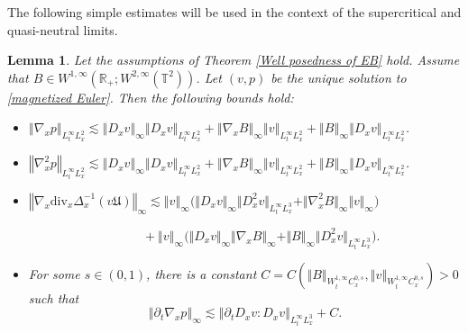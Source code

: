 \documentclass[11pt,reqno]{amsart}
\newtheorem{lem}[thm]{Lemma}
\numberwithin{equation}{section}
\begin{document}
The following simple estimates will be used in the context of the supercritical and quasi-neutral limits. 
\begin{lem}\label{basic estimates}
Let the assumptions of {\rm Theorem \ref{Well posedness of EB}} hold.  Assume 
that $B\in W^{1,\infty}(\mathbb{R}_{+};W^{2,\infty}(\mathbb{T}^{2}))$. 
Let $(v,p)$ be the unique solution to \eqref{magnetized Euler}. 
Then the following bounds hold{\rm:} 
\begin{itemize}
   \item[{\rm(i)}]
    $\left\Vert \nabla_{x}p\right\Vert_{L^{\infty}_{t}L^{2}_{x}}\lesssim
    \left\Vert D_{x}v\right\Vert_{\infty} \left\Vert D_{x}v\right\Vert_{L^{\infty}_{t}L^{2}_{x}}
    +\left\Vert \nabla_{x}B\right\Vert_{\infty}\left\Vert v\right\Vert_{L^\infty_tL^2_x}
    +\left\Vert B\right\Vert_{\infty}\left\Vert D_xv\right\Vert_{L^\infty_tL^2_x}$.
    \item[{\rm(ii)}] $\left\Vert \nabla_{x}^{2}p\right\Vert_{L^{\infty}_{t}L^2_{x}}\lesssim
    \left\Vert D_{x}v\right\Vert_{\infty}\left\Vert D_{x}v\right\Vert_{L^{\infty}_{t}L^{2}_{x}}
    +\left\Vert \nabla_{x}B\right\Vert_{\infty}\left\Vert v\right\Vert_{L^\infty_tL^2_x}
    +\left\Vert B\right\Vert_{\infty}\left\Vert D_xv\right\Vert_{L^\infty_tL^2_x}$.
   \item[{\rm(iii)}] 
$\left\Vert \nabla_{x}\mathrm{div}_{x}\Delta^{-1}_{x}(v\mathfrak{U})\right\Vert_{\infty}
   \lesssim\left\Vert v\right\Vert_{\infty}\big(\Vert D_{x}v\Vert_{\infty}\Vert D_{x}^{2}v\Vert_{L^{\infty}_{t}L^3_{x}}+\Vert \nabla_{x}^{2}B\Vert_{\infty}\Vert v\Vert_{\infty}\big)$
   
   $\qquad\qquad \qquad\qquad\quad+\left\Vert v\right\Vert_{\infty} \big(\Vert D_{x}v\Vert_{\infty}\Vert \nabla_{x}B\Vert_{\infty}+\Vert B\Vert_{\infty}\Vert D_{x}^{2}v\Vert_{L^\infty_{t}L^{3}_{x}}\big).$     
 \item[{\rm(iv)}] For some $s\in (0,1)$, there is a constant $C=C(\left\Vert B\right\Vert_{W^{1,\infty}_{t}C^{0,s}_{x}},\left\Vert v\right\Vert_{W^{1,\infty}_{t}C^{0,s}_{x}})>0$ such that 
$$
\left\Vert \partial_{t}\nabla_{x}p\right\Vert_{\infty}\lesssim \left\Vert \partial_{t}D_{x}v:D_{x}v\right\Vert_{L^{\infty}_{t}L^{3}_{x}}+C.
$$ 
\end{itemize}    
\end{lem}
\end{document}
